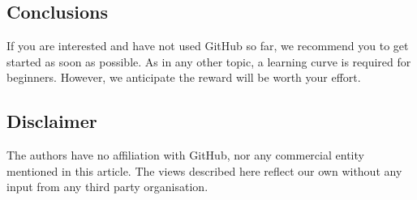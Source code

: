 \documentclass[10pt,letterpaper]{article}
\begin{document}
\subsection*{Conclusions}\label{conclusions}

If you are interested and have not used GitHub so far, we recommend you
to get started as soon as possible. As in any other topic, a learning
curve is required for beginners. However, we anticipate the reward will
be worth your effort.

\subsection*{Disclaimer}\label{disclaimer}

The authors have no affiliation with GitHub, nor any commercial entity
mentioned in this article. The views described here reflect our own
without any input from any third party organisation.

\nolinenumbers

 
\end{document}
